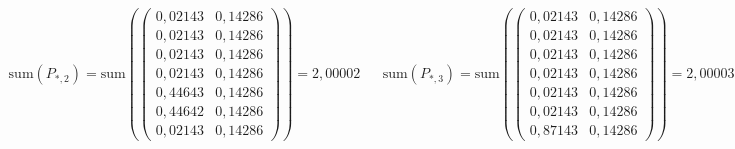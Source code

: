 \begin{align}
	\label{eq:a_mdpc_example}
	\text{sum}(P_{\ast,2}) = \text{sum}(
		\begin{pmatrix}
			0,02143 & 0,14286 \\
			0,02143 & 0,14286 \\
			0,02143 & 0,14286 \\
			0,02143 & 0,14286 \\
			0,44643 & 0,14286 \\
			0,44642 & 0,14286 \\
			0,02143 & 0,14286
		\end{pmatrix}
	) = 2,00002 & &
	\text{sum}(P_{\ast,3}) = \text{sum}(
		\begin{pmatrix}
			0,02143 & 0,14286 \\
			0,02143 & 0,14286 \\
			0,02143 & 0,14286 \\
			0,02143 & 0,14286 \\
			0,02143 & 0,14286 \\
			0,02143 & 0,14286 \\
			0,87143 & 0,14286
		\end{pmatrix}
	) = 2,00003
\end{align}

